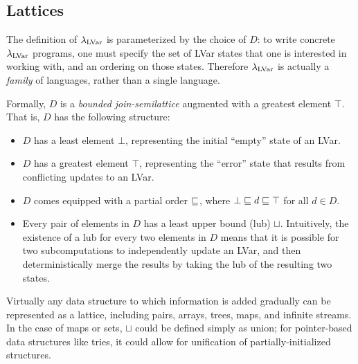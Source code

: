 \subsection{Lattices}\label{subsection:domains}

The definition of $\textup{\ensuremath{\lambda_{\textrm{LVar}}}}$ is parameterized by the choice of $D$: to write concrete $\textup{\ensuremath{\lambda_{\textrm{LVar}}}}$ programs, one must specify
the set of LVar states that one is interested in working with,
and an ordering on those states.
  Therefore
$\textup{\ensuremath{\lambda_{\textrm{LVar}}}}$ is actually a \emph{family} of languages, rather than a
single language.

Formally, $D$ is a \emph{bounded} \emph{join-semilattice} augmented
with a greatest element $\top$.  That is, $D$ has the following
structure:
\begin{itemize}
\item $D$ has a least element $\bot$, representing the initial
  ``empty'' state of an LVar.

\item $D$ has a greatest element $\top$, representing the ``error''
  state that results from conflicting updates to an LVar.

\item $D$ comes equipped with a partial order $\sqsubseteq$, where $\bot
  \sqsubseteq d \sqsubseteq \top$ for all $d \in D$.

\item Every pair of elements in $D$ has a least upper bound (lub)
  $\sqcup$.  Intuitively, the existence of a lub for every two
  elements in $D$ means that it is possible for two subcomputations to
  independently update an LVar, and then deterministically merge the
  results by taking the lub of the resulting two states.
\end{itemize}

\noindent Virtually any data structure to which information
is added gradually can be represented as a lattice,
including pairs, arrays, trees, maps, and infinite streams.
%
{In the case of maps or sets, $\sqcup$ could be defined simply as union; for
pointer-based data structures like tries, it could allow for unification of partially-initialized structures.}
%

